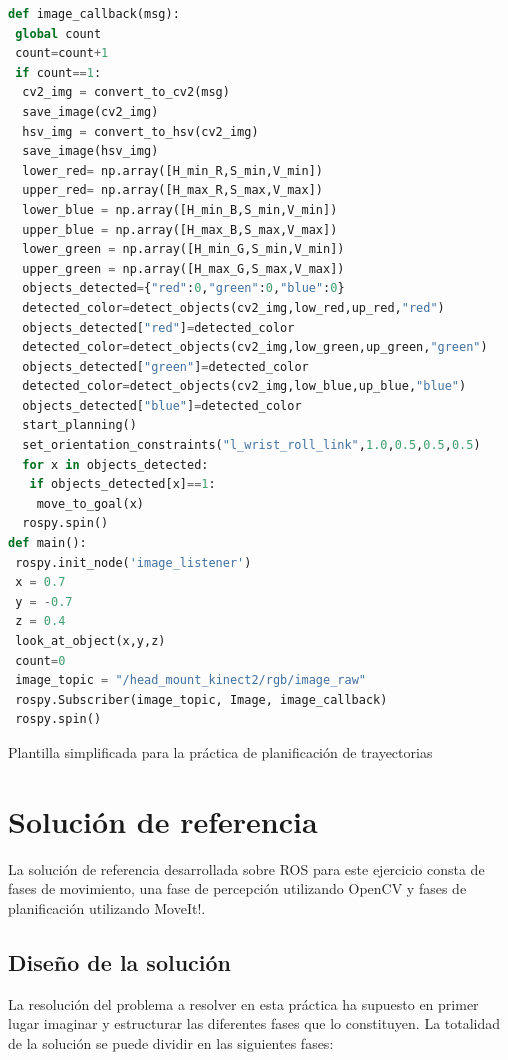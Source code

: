 \documentclass[12pt,spanish,chapterprefix, numbers=noenddot]{book}
\numberwithin{equation}{section}
\numberwithin{figure}{section}
\begin{document}
\vspace{20pt}
\begin{algorithm}[htb!]
	\begin{lstlisting}[breaklines=true,language=python]    
def image_callback(msg):
 global count
 count=count+1
 if count==1:
  cv2_img = convert_to_cv2(msg)
  save_image(cv2_img)
  hsv_img = convert_to_hsv(cv2_img)
  save_image(hsv_img)
  lower_red= np.array([H_min_R,S_min,V_min])
  upper_red= np.array([H_max_R,S_max,V_max])
  lower_blue = np.array([H_min_B,S_min,V_min])
  upper_blue = np.array([H_max_B,S_max,V_max])
  lower_green = np.array([H_min_G,S_min,V_min])
  upper_green = np.array([H_max_G,S_max,V_max])
  objects_detected={"red":0,"green":0,"blue":0}
  detected_color=detect_objects(cv2_img,low_red,up_red,"red")
  objects_detected["red"]=detected_color
  detected_color=detect_objects(cv2_img,low_green,up_green,"green")
  objects_detected["green"]=detected_color
  detected_color=detect_objects(cv2_img,low_blue,up_blue,"blue")
  objects_detected["blue"]=detected_color
  start_planning()
  set_orientation_constraints("l_wrist_roll_link",1.0,0.5,0.5,0.5)
  for x in objects_detected:
   if objects_detected[x]==1:
    move_to_goal(x)
  rospy.spin()
def main():
 rospy.init_node('image_listener')
 x = 0.7
 y = -0.7
 z = 0.4
 look_at_object(x,y,z)
 count=0
 image_topic = "/head_mount_kinect2/rgb/image_raw"
 rospy.Subscriber(image_topic, Image, image_callback)
 rospy.spin()
	\end{lstlisting}
\caption{\label{alg:template-py}Plantilla simplificada para la práctica de planificación de trayectorias}
\end{algorithm}

\chapter{Solución de referencia}\label{sec:solución}
La solución de referencia desarrollada sobre ROS para este ejercicio consta de fases de movimiento, una fase de percepción utilizando OpenCV y fases de planificación utilizando MoveIt!.  

\section{Diseño de la solución}

La resolución del problema a resolver en esta práctica ha supuesto en primer lugar imaginar y estructurar las diferentes fases que lo constituyen. La totalidad de la solución se puede dividir en las siguientes fases: 
\end{document}
